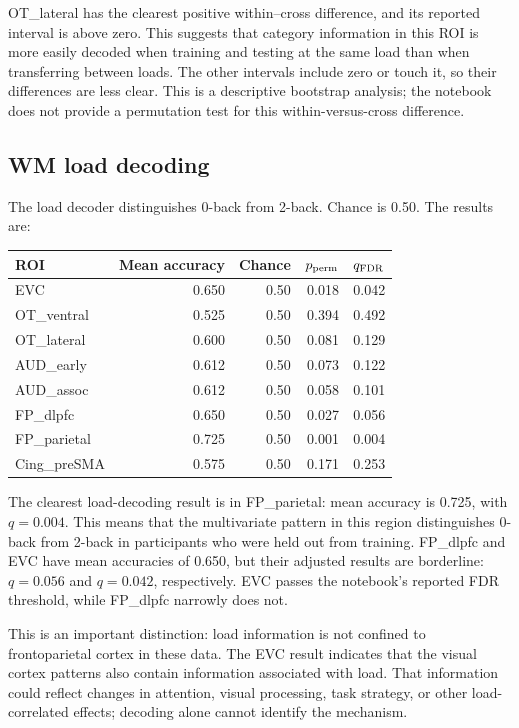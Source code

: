\documentclass[11pt,a4paper]{article}
\begin{document}
OT\_lateral has the clearest positive within--cross difference, and its reported interval is above zero. This suggests that category information in this ROI is more easily decoded when training and testing at the same load than when transferring between loads. The other intervals include zero or touch it, so their differences are less clear. This is a descriptive bootstrap analysis; the notebook does not provide a permutation test for this within-versus-cross difference.

\subsection{WM load decoding}

The load decoder distinguishes 0-back from 2-back. Chance is 0.50. The results are:

\begin{center}
\begin{tabular}{lrrrr}
\toprule
\textbf{ROI} & \textbf{Mean accuracy} & \textbf{Chance} & \textbf{\(p_{\rm perm}\)} & \textbf{\(q_{\rm FDR}\)}\\
\midrule
EVC & 0.650 & 0.50 & 0.018 & 0.042\\
OT\_ventral & 0.525 & 0.50 & 0.394 & 0.492\\
OT\_lateral & 0.600 & 0.50 & 0.081 & 0.129\\
AUD\_early & 0.612 & 0.50 & 0.073 & 0.122\\
AUD\_assoc & 0.612 & 0.50 & 0.058 & 0.101\\
FP\_dlpfc & 0.650 & 0.50 & 0.027 & 0.056\\
FP\_parietal & 0.725 & 0.50 & 0.001 & 0.004\\
Cing\_preSMA & 0.575 & 0.50 & 0.171 & 0.253\\
\bottomrule
\end{tabular}
\end{center}

The clearest load-decoding result is in FP\_parietal: mean accuracy is 0.725, with \(q=0.004\). This means that the multivariate pattern in this region distinguishes 0-back from 2-back in participants who were held out from training. FP\_dlpfc and EVC have mean accuracies of 0.650, but their adjusted results are borderline: \(q=0.056\) and \(q=0.042\), respectively. EVC passes the notebook's reported FDR threshold, while FP\_dlpfc narrowly does not.

This is an important distinction: load information is not confined to frontoparietal cortex in these data. The EVC result indicates that the visual cortex patterns also contain information associated with load. That information could reflect changes in attention, visual processing, task strategy, or other load-correlated effects; decoding alone cannot identify the mechanism.
\end{document}

